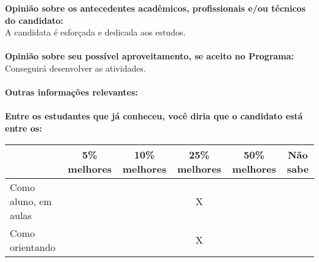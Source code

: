 \documentclass[11pt]{article}
\begin{document}
\textbf{Opinião sobre os antecedentes acadêmicos, profissionais e/ou técnicos do candidato:}
\\A candidata é esforçada e dedicada aos estudos.\\
\\
\textbf{Opinião sobre seu possível aproveitamento, se aceito no Programa:}
\\Conseguirá desenvolver as atividades.\\ 
\\
\textbf{Outras informações relevantes:} \\
\\[0.3cm]
\textbf{Entre os estudantes que já conheceu, você diria que o candidato está entre os:}
\\
\begin{tabular}{|l|c|c|c|c|c|}
\hline
 & 5\% melhores & 10\% melhores & 25\% melhores & 50\% melhores & Não sabe \\
\hline
Como aluno, em aulas &  &  & X &  & \\
\hline
Como orientando &  &  & X &  & \\
\hline
\end{tabular}
\end{document}
